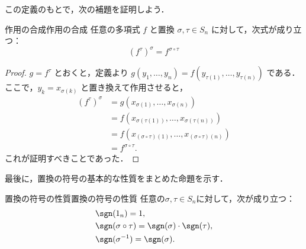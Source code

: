 この定義のもとで，次の補題を証明しよう．
\begin{lemma}{作用の合成}{作用の合成}
  任意の多項式 $f$ と置換 $\sigma, \tau \in S_n$ に対して，次式が成り立つ：
  \[
  (f^\tau)^\sigma = f^{\sigma \circ \tau}
  \]
\end{lemma}

\begin{leftbar}
\begin{proof}
  $g = f^\tau$ とおくと，定義より $g(y_1, \dots, y_n) = f(y_{\tau(1)}, \dots, y_{\tau(n)})$ である．
  ここで，$y_k = x_{\sigma(k)}$ と置き換えて作用させると，
  \begin{align*}
    (f^\tau)^\sigma &= g(x_{\sigma(1)}, \dots, x_{\sigma(n)}) \\
    &= f(x_{\sigma(\tau(1))}, \dots, x_{\sigma(\tau(n))}) \\
    &= f(x_{(\sigma \circ \tau)(1)}, \dots, x_{(\sigma \circ \tau)(n)}) \\
    &= f^{\sigma \circ \tau}.
  \end{align*}
  これが証明すべきことであった．
\end{proof}
\end{leftbar}
最後に，置換の符号の基本的な性質をまとめた命題を示す．

\begin{prop}{置換の符号の性質}{置換の符号の性質}
  任意の$\sigma, \tau \in S_n$に対して，次が成り立つ：
  \begin{align*} 
     &\sgn(1_n)  = 1, \\
    &\sgn(\sigma \circ \tau) = \sgn(\sigma) \cdot \sgn(\tau), \\
     &\sgn(\sigma^{-1}) = \sgn(\sigma).
  \end{align*}
\end{prop}


